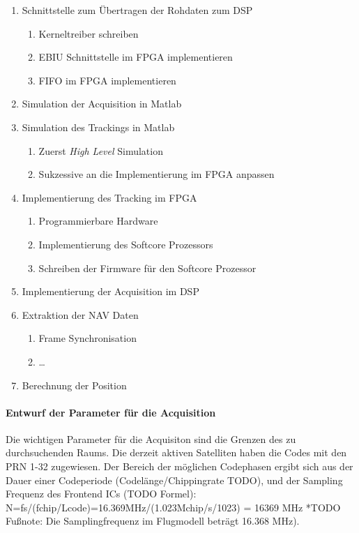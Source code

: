 \begin{enumerate}
\item Schnittstelle zum Übertragen der Rohdaten zum DSP
    \begin{enumerate}
    \item Kerneltreiber schreiben
    \item EBIU Schnittstelle im FPGA implementieren
    \item FIFO im FPGA implementieren
    \end{enumerate}
\item Simulation der Acquisition in Matlab
\item Simulation des Trackings in Matlab
    \begin{enumerate}
    \item Zuerst \emph{High Level} Simulation
    \item Sukzessive an die Implementierung im FPGA anpassen
    \end{enumerate}
\item Implementierung des Tracking im FPGA
    \begin{enumerate}
    \item Programmierbare Hardware
    \item Implementierung des Softcore Prozessors
    \item Schreiben der Firmware für den Softcore Prozessor
    \end{enumerate}
\item Implementierung der Acquisition im DSP
\item Extraktion der NAV Daten
\begin{enumerate}
    \item Frame Synchronisation
    \item \ldots
\end{enumerate}
\item Berechnung der Position
\end{enumerate}



\paragraph{Entwurf der Parameter für die Acquisition}
Die wichtigen Parameter für die Acquisiton sind die Grenzen des zu durchsuchenden Raums.
Die derzeit aktiven Satelliten haben die Codes mit den PRN 1-32 zugewiesen. Der Bereich der möglichen Codephasen ergibt sich aus der Dauer einer Codeperiode (Codelänge/Chippingrate TODO), und der Sampling Frequenz des Frontend ICs (TODO Formel): N=fs/(fchip/Lcode)=16.369MHz/(1.023Mchip/s/1023) = 16369 MHz *TODO Fußnote: Die Samplingfrequenz im Flugmodell beträgt 16.368 MHz).

